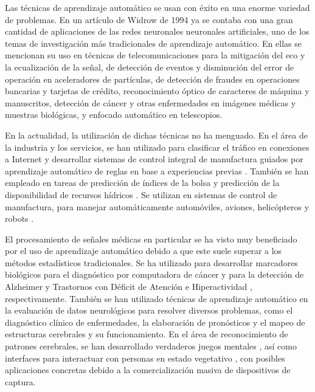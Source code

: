 

Las técnicas de aprendizaje automático se usan con éxito en una enorme variedad de problemas. En un artículo de Widrow \cite{widrow1994} de 1994 ya se contaba con una gran cantidad de aplicaciones de las redes neuronales neuronales artificiales, uno de los temas de investigación más tradicionales de aprendizaje automático. En ellas se mencionan su uso en técnicas de telecomunicaciones para la mitigación del eco y la ecualización de la señal, de detección de eventos y disminución del error de operación en aceleradores de partículas, de detección de fraudes en operaciones bancarias y tarjetas de crédito, reconocimiento óptico de caracteres de máquina y manuscritos, detección de cáncer y otras enfermedades en imágenes médicas y muestras biológicas, y enfocado automático en telescopios.

En la actualidad, la utilización de dichas técnicas no ha menguado. En el área de la industria y los servicios, se han utilizado para clasificar el tráfico en conexiones a Internet \cite{yuan2010} y desarrollar sistemas de control integral de manufactura guiados por aprendizaje automático de reglas en base a experiencias previas \cite{shiue2012}. También se han empleado en tareas de predicción de índices de la bolsa \cite{kim2000} y predicción de la disponibilidad de recursos hídricos \cite{maier2000}. Se utilizan en sistemas de control de manufactura, para manejar automáticamente automóviles, aviones, helicópteros y robots \cite{pomerleau1991,pomerleau1993,azlan1999,rahideh2012}. 

El procesamiento de señales médicas en particular se ha visto muy beneficiado por el uso de aprendizaje automático debido a que este suele superar a los métodos estadísticos tradicionales. Se ha utilizado para desarrollar marcadores biológicos para el diagnóstico por computadora de cáncer \cite{abeel2010}  y para la detección de Alzheimer y Trastornos con Déficit de Atención e Hiperactividad \cite{lehmann2007,sidhu2012}, respectivamente. También se han utilizado técnicas de aprendizaje automático en la evaluación de datos neurológicos para resolver diversos problemas, como el diagnóstico clínico de enfermedades, la elaboración de pronósticos y el mapeo de estructuras cerebrales y su funcionamiento. En el área de reconocimiento de patrones cerebrales, se han desarrollado verdaderos juegos mentales \cite{finke2009}, así como interfaces para interactuar con personas en estado vegetativo \cite{lule2012}, con posibles aplicaciones concretas debido a la comercialización masiva de dispositivos de captura.

